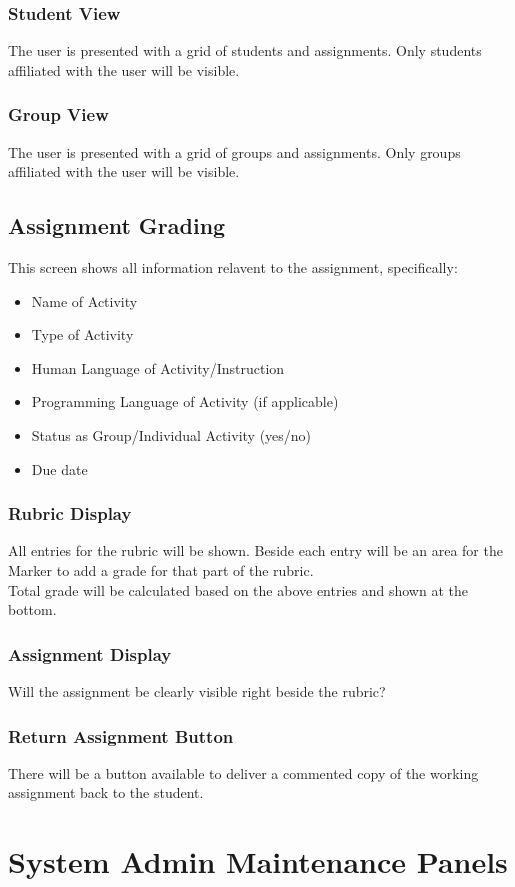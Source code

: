 \documentclass{article}
\begin{document}
\subsubsection{Student View}
The user is presented with a grid of students and assignments. Only students
affiliated with the user will be visible.
\subsubsection{Group View}
The user is presented with a grid of groups and assignments. Only groups
affiliated with the user will be visible.
\subsection{Assignment Grading}
This screen shows all information relavent to the assignment, specifically:
\begin{itemize}
  \item Name of Activity
  \item Type of Activity
  \item Human Language of Activity/Instruction
  \item Programming Language of Activity (if applicable)
  \item Status as Group/Individual Activity (yes/no)
  \item Due date
\end{itemize}
\subsubsection{Rubric Display}
All entries for the rubric will be shown. Beside each entry will be an
area for the Marker to add a grade for that part of the rubric.\\
Total grade will be calculated based on the above entries and shown at the
bottom.
\subsubsection{Assignment Display}
Will the assignment be clearly visible right beside the rubric?
\subsubsection{Return Assignment Button}
There will be a button available to deliver a commented copy of the working
assignment back to the student.

\section{System Admin Maintenance Panels}
\end{document}
